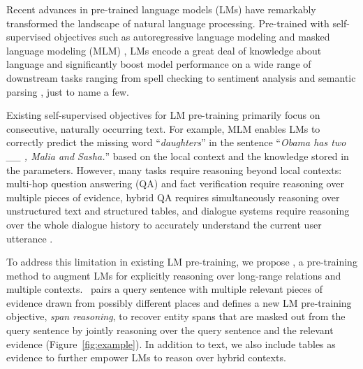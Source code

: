 \documentclass[11pt]{article}
\newcommand{\nop}[1]{}
\newcommand{\ours}[0]{\text{ReasonBERT}}
\begin{document}
Recent advances in pre-trained language models (LMs) have remarkably transformed the landscape of natural language processing. Pre-trained \nop{to reconstruct naturally occurring utterances sampled from massive text corpora }with self-supervised objectives such as autoregressive language modeling \cite{Radford2018ImprovingLU,Radford2019LanguageMA,NEURIPSgpt3} and masked language modeling (MLM) \cite{devlin-etal-2019-bert, Liu2019RoBERTaAR, joshi-etal-2020-spanbert}, LMs encode a great deal of knowledge about language and significantly boost model performance on a wide range of downstream tasks \cite{liu-etal-2019-multi,NEURIPS2019_superglue,wang-etal-2018-glue} ranging from spell checking \cite{awasthi-etal-2019-parallel} to sentiment analysis \cite{xu-etal-2019-bert} and semantic parsing \cite{rongali2020don}, just to name a few.  

Existing self-supervised objectives for LM pre-training primarily focus on consecutive, naturally occurring text. For example, MLM enables LMs to correctly predict the missing word ``\textit{daughters}'' in the sentence ``\textit{Obama has two \_\_ , Malia and Sasha.}'' based on the local context and the knowledge stored in the parameters. However, many tasks require reasoning  beyond local contexts: multi-hop question answering (QA) \cite{yang-etal-2018-hotpotqa, welbl-etal-2018-constructing} and  fact verification \cite{jiang-etal-2020-hover} require reasoning over multiple pieces of evidence, hybrid QA \cite{chen-etal-2020-hybridqa} requires simultaneously reasoning over unstructured text and structured tables, and dialogue systems require reasoning over the whole dialogue history to accurately understand the current user utterance \cite{SMDataflow2020}. 

To address this limitation in existing LM pre-training, we propose \ours, a pre-training method to augment LMs for explicitly reasoning over long-range relations and multiple contexts. \nop{Unlike existing pre-training objectives that predict individual masked tokens or spans within a contiguous paragraph of text, }\ours\ pairs a query sentence with multiple relevant pieces of evidence drawn from possibly different places and defines a new LM pre-training objective, \textit{span reasoning}, to recover entity spans that are masked out from the query sentence by jointly reasoning over the query sentence and the relevant evidence (Figure~\ref{fig:example}). In addition to text, we also include tables as evidence to further empower LMs to reason over hybrid contexts. 
\end{document}
